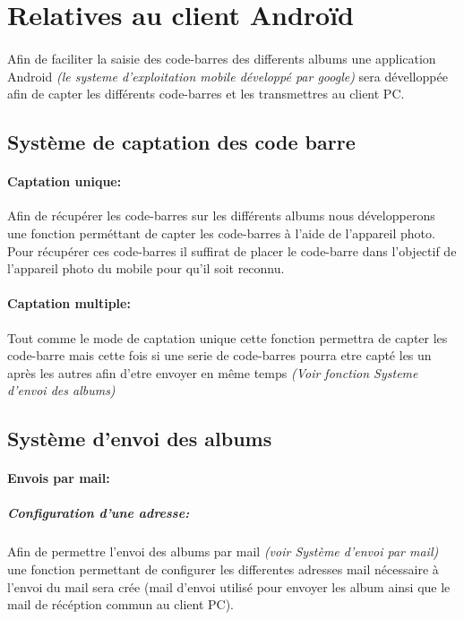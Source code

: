 \section{Relatives au client Androïd} 
\begin{description}

\paragraph{}
Afin de faciliter la saisie des code-barres des differents albums une application Android \textit{(le systeme d'exploitation mobile développé par google)} sera dévelloppée afin de capter les différents code-barres et les transmettres au client PC.


\subsection{Système de captation des code barre}
\paragraph{Captation unique:}
Afin de récupérer les code-barres sur les différents albums nous développerons une fonction perméttant de capter les code-barres à l'aide de l'appareil photo.
Pour récupérer ces code-barres il suffirat de placer le code-barre dans l'objectif de l'appareil photo du mobile pour qu'il soit reconnu.

\paragraph{Captation multiple:}
Tout comme le mode de captation unique cette fonction permettra de capter les code-barre mais cette fois si une serie de code-barres pourra etre capté les un après les autres afin d'etre envoyer en même temps \textit{(Voir fonction Systeme d'envoi des albums)}

\subsection{Système d'envoi des albums}
\paragraph{Envois par mail:}
\subparagraph{Configuration d'une adresse:}
Afin de permettre l'envoi des albums par mail \textit{(voir Système d'envoi par mail)} une fonction permettant de configurer les differentes adresses mail nécessaire à l'envoi du mail sera crée (mail d'envoi utilisé pour envoyer les album ainsi que le mail de récéption commun au client PC).


\end{description}
